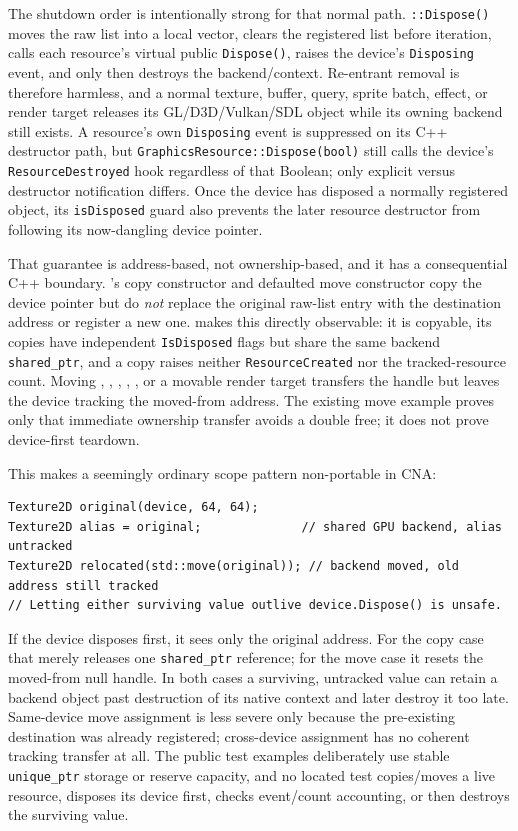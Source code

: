 The shutdown order is intentionally strong for that normal path. \texttt{::Dispose()}
moves the raw list into a local vector, clears the registered list before iteration, calls each
resource's virtual public \texttt{Dispose()}, raises the device's \texttt{Disposing} event, and
only then destroys the backend/context. Re-entrant removal is therefore harmless, and a normal
texture, buffer, query, sprite batch, effect, or render target releases its GL/D3D/Vulkan/SDL
object while its owning backend still exists. A resource's own \texttt{Disposing} event is
suppressed on its C++ destructor path, but \texttt{GraphicsResource::Dispose(bool)} still calls
the device's \texttt{ResourceDestroyed} hook regardless of that Boolean; only explicit versus
destructor notification differs. Once the device has disposed a normally registered object,
its \texttt{isDisposed} guard also prevents the later resource destructor from following its
now-dangling device pointer.

That guarantee is address-based, not ownership-based, and it has a consequential C++ boundary.
's copy constructor and defaulted move constructor copy the device
pointer but do \emph{not} replace the original raw-list entry with the destination address or
register a new one.  makes this directly observable: it is copyable, its
copies have independent \texttt{IsDisposed} flags but share the same backend
\texttt{shared\_ptr}, and a copy raises neither \texttt{ResourceCreated} nor the tracked-resource
count. Moving , , ,
, , or a movable render target transfers the handle
but leaves the device tracking the moved-from address. The existing move example proves only
that immediate ownership transfer avoids a double free; it does not prove device-first teardown.

This makes a seemingly ordinary scope pattern non-portable in CNA:

\begin{lstlisting}
Texture2D original(device, 64, 64);
Texture2D alias = original;              // shared GPU backend, alias untracked
Texture2D relocated(std::move(original)); // backend moved, old address still tracked
// Letting either surviving value outlive device.Dispose() is unsafe.
\end{lstlisting}

If the device disposes first, it sees only the original address. For the copy case that merely
releases one \texttt{shared\_ptr} reference; for the move case it resets the moved-from null
handle. In both cases a surviving, untracked value can retain a backend object past destruction
of its native context and later destroy it too late. Same-device move assignment is less severe
only because the pre-existing destination was already registered; cross-device assignment has
no coherent tracking transfer at all. The public test examples deliberately use stable
\texttt{unique\_ptr} storage or reserve capacity, and no located test copies/moves a live
resource, disposes its device first, checks event/count accounting, or then destroys the
surviving value.

